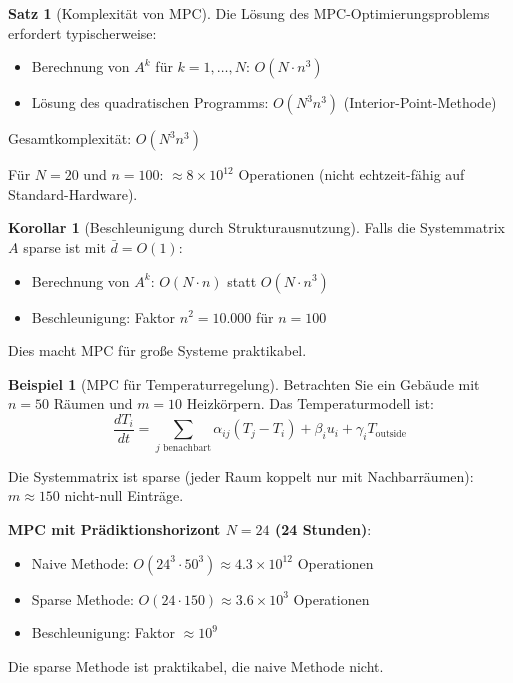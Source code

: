 \documentclass[a4paper,12pt]{report}
\theoremstyle{definition}
\newtheorem{beispiel}{Beispiel}
\newtheorem{satz}{Satz}
\newtheorem{korollar}{Korollar}
\begin{document}
	\begin{satz}[Komplexität von MPC]
		Die Lösung des MPC-Optimierungsproblems erfordert typischerweise:
		\begin{itemize}
			\item Berechnung von $A^k$ für $k = 1, \ldots, N$: $O(N \cdot n^3)$
			\item Lösung des quadratischen Programms: $O(N^3 n^3)$ (Interior-Point-Methode)
		\end{itemize}
		
		Gesamtkomplexität: $O(N^3 n^3)$
		
		Für $N = 20$ und $n = 100$: $\approx 8 \times 10^{12}$ Operationen (nicht echtzeit-fähig auf Standard-Hardware).
	\end{satz}
	
	\begin{korollar}[Beschleunigung durch Strukturausnutzung]
		Falls die Systemmatrix $A$ sparse ist mit $\bar{d} = O(1)$:
		\begin{itemize}
			\item Berechnung von $A^k$: $O(N \cdot n)$ statt $O(N \cdot n^3)$
			\item Beschleunigung: Faktor $n^2 = 10.000$ für $n = 100$
		\end{itemize}
		
		Dies macht MPC für große Systeme praktikabel.
	\end{korollar}
	
	\begin{beispiel}[MPC für Temperaturregelung]
		Betrachten Sie ein Gebäude mit $n = 50$ Räumen und $m = 10$ Heizkörpern. Das Temperaturmodell ist:
		\[
		\frac{dT_i}{dt} = \sum_{j \text{ benachbart}} \alpha_{ij} (T_j - T_i) + \beta_i u_i + \gamma_i T_{\text{outside}}
		\]
		
		Die Systemmatrix ist sparse (jeder Raum koppelt nur mit Nachbarräumen): $m \approx 150$ nicht-null Einträge.
		
		\textbf{MPC mit Prädiktionshorizont $N = 24$ (24 Stunden)}:
		\begin{itemize}
			\item Naive Methode: $O(24^3 \cdot 50^3) \approx 4.3 \times 10^{12}$ Operationen
			\item Sparse Methode: $O(24 \cdot 150) \approx 3.6 \times 10^3$ Operationen
			\item Beschleunigung: Faktor $\approx 10^9$
		\end{itemize}
		
		Die sparse Methode ist praktikabel, die naive Methode nicht.
	\end{beispiel}
	
\end{document}
